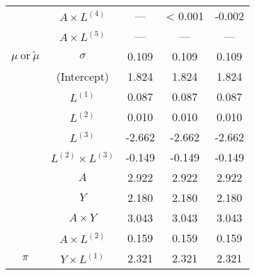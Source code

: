 \begin{sidewaystable}
\begin{minipage}[t]{0.5\textwidth}
\begin{tabular}[t]{>{}cccc>{}c}
\cmidrule{2-5}
 & $A \times L^{(4)}$ & --- & < 0.001 & -0.002\\
\cmidrule{2-5}
 & $A \times L^{(5)}$ & --- & --- & ---\\
\cmidrule{2-5}
\multirow{-15}{*}{\centering\arraybackslash $\mu~\text{or}~\tilde\mu$} & $\sigma$ & 0.109 & 0.109 & 0.109\\
\cmidrule{1-5}
 & (Intercept) & 1.824 & 1.824 & 1.824\\
\cmidrule{2-5}
 & $L^{(1)}$ & 0.087 & 0.087 & 0.087\\
\cmidrule{2-5}
 & $L^{(2)}$ & 0.010 & 0.010 & 0.010\\
\cmidrule{2-5}
 & $L^{(3)}$ & -2.662 & -2.662 & -2.662\\
\cmidrule{2-5}
 & $L^{(2)} \times L^{(3)}$ & -0.149 & -0.149 & -0.149\\
\cmidrule{2-5}
 & $A$ & 2.922 & 2.922 & 2.922\\
\cmidrule{2-5}
 & $Y$ & 2.180 & 2.180 & 2.180\\
\cmidrule{2-5}
 & $A\times Y$ & 3.043 & 3.043 & 3.043\\
\cmidrule{2-5}
 & $A \times L^{(2)}$ & 0.159 & 0.159 & 0.159\\
\cmidrule{2-5}
\multirow{-10}{*}{\centering\arraybackslash $\pi$} & $Y \times L^{(1)}$ & 2.321 & 2.321 & 2.321\\
\hline
\end{tabular}
\end{minipage}
\begin{minipage}[t]{0.5\textwidth}


\end{minipage}
\end{sidewaystable}
